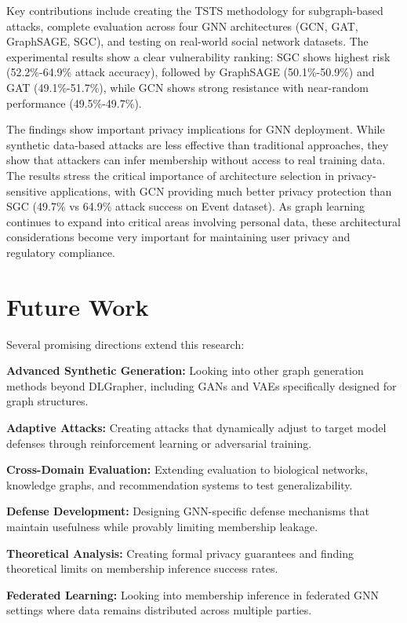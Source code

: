 \documentclass{article}
\begin{document}
Key contributions include creating the TSTS methodology for subgraph-based attacks, complete evaluation across four GNN architectures (GCN, GAT, GraphSAGE, SGC), and testing on real-world social network datasets. The experimental results show a clear vulnerability ranking: SGC shows highest risk (52.2\%-64.9\% attack accuracy), followed by GraphSAGE (50.1\%-50.9\%) and GAT (49.1\%-51.7\%), while GCN shows strong resistance with near-random performance (49.5\%-49.7\%).

The findings show important privacy implications for GNN deployment. While synthetic data-based attacks are less effective than traditional approaches, they show that attackers can infer membership without access to real training data. The results stress the critical importance of architecture selection in privacy-sensitive applications, with GCN providing much better privacy protection than SGC (49.7\% vs 64.9\% attack success on Event dataset). As graph learning continues to expand into critical areas involving personal data, these architectural considerations become very important for maintaining user privacy and regulatory compliance.

\section{Future Work}
Several promising directions extend this research:

\textbf{Advanced Synthetic Generation:} Looking into other graph generation methods beyond DLGrapher, including GANs and VAEs specifically designed for graph structures.

\textbf{Adaptive Attacks:} Creating attacks that dynamically adjust to target model defenses through reinforcement learning or adversarial training.

\textbf{Cross-Domain Evaluation:} Extending evaluation to biological networks, knowledge graphs, and recommendation systems to test generalizability.

\textbf{Defense Development:} Designing GNN-specific defense mechanisms that maintain usefulness while provably limiting membership leakage.

\textbf{Theoretical Analysis:} Creating formal privacy guarantees and finding theoretical limits on membership inference success rates.

\textbf{Federated Learning:} Looking into membership inference in federated GNN settings where data remains distributed across multiple parties.





\end{document}
